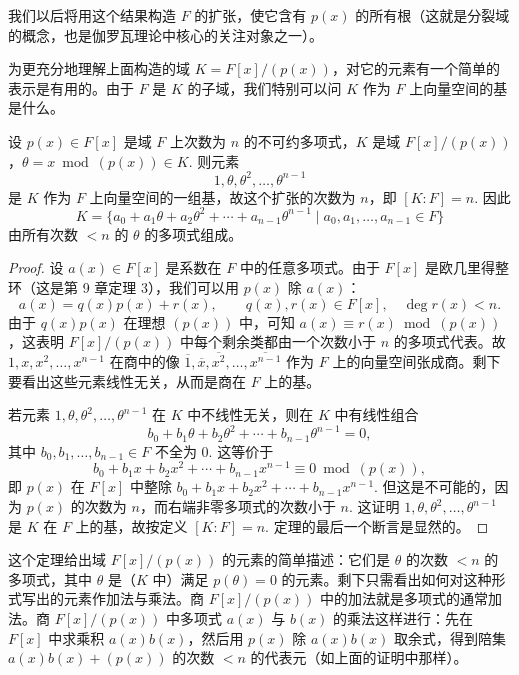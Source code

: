 我们以后将用这个结果构造 \(F\) 的扩张，使它含有 \(p(x)\) 的所有根（这就是分裂域的概念，也是伽罗瓦理论中核心的关注对象之一）。

为更充分地理解上面构造的域 \(K = F[x]/(p(x))\)，对它的元素有一个简单的表示是有用的。由于 \(F\) 是 \(K\) 的子域，我们特别可以问 \(K\) 作为 \(F\) 上向量空间的基是什么。

\begin{theorem}\label{thm:13.4}
设 \(p(x) \in F[x]\) 是域 \(F\) 上次数为 \(n\) 的不可约多项式，\(K\) 是域 \(F[x]/(p(x))\)，\(\theta = x \bmod (p(x)) \in K\). 则元素
\[
1, \theta, \theta^2, \ldots, \theta^{n-1}
\]
是 \(K\) 作为 \(F\) 上向量空间的一组基，故这个扩张的次数为 \(n\)，即 \([K:F] = n\). 因此
\[
K = \{a_0+a_1\theta+a_2\theta^2+\cdots+a_{n-1}\theta^{n-1} \mid a_0, a_1, \ldots, a_{n-1} \in F\}
\]
由所有次数 \(< n\) 的 \(\theta\) 的多项式组成。
\end{theorem}

\begin{proof}
设 \(a(x) \in F[x]\) 是系数在 \(F\) 中的任意多项式。由于 \(F[x]\) 是欧几里得整环（这是第 9 章定理 3），我们可以用 \(p(x)\) 除 \(a(x)\)：
\[
a(x) = q(x)p(x)+r(x), \qquad q(x), r(x) \in F[x], \quad \deg r(x) < n.
\]
由于 \(q(x)p(x)\) 在理想 \((p(x))\) 中，可知 \(a(x) \equiv r(x) \bmod (p(x))\)，这表明 \(F[x]/(p(x))\) 中每个剩余类都由一个次数小于 \(n\) 的多项式代表。故 \(1, x, x^2, \ldots, x^{n-1}\) 在商中的像 \(\overline{1}, \overline{x}, \overline{x^2}, \ldots, \overline{x^{n-1}}\) 作为 \(F\) 上的向量空间张成商。剩下要看出这些元素线性无关，从而是商在 \(F\) 上的基。

若元素 \(1, \theta, \theta^2, \ldots, \theta^{n-1}\) 在 \(K\) 中不线性无关，则在 \(K\) 中有线性组合
\[
b_0+b_1\theta+b_2\theta^2+\cdots+b_{n-1}\theta^{n-1} = 0,
\]
其中 \(b_0, b_1, \ldots, b_{n-1} \in F\) 不全为 0. 这等价于
\[
b_0+b_1x+b_2x^2+\cdots+b_{n-1}x^{n-1} \equiv 0 \bmod (p(x)),
\]
即 \(p(x)\) 在 \(F[x]\) 中整除 \(b_0+b_1x+b_2x^2+\cdots+b_{n-1}x^{n-1}\). 但这是不可能的，因为 \(p(x)\) 的次数为 \(n\)，而右端非零多项式的次数小于 \(n\). 这证明 \(1, \theta, \theta^2, \ldots, \theta^{n-1}\) 是 \(K\) 在 \(F\) 上的基，故按定义 \([K:F] = n\). 定理的最后一个断言是显然的。
\end{proof}

这个定理给出域 \(F[x]/(p(x))\) 的元素的简单描述：它们是 \(\theta\) 的次数 \(< n\) 的多项式，其中 \(\theta\) 是（\(K\) 中）满足 \(p(\theta) = 0\) 的元素。剩下只需看出如何对这种形式写出的元素作加法与乘法。商 \(F[x]/(p(x))\) 中的加法就是多项式的通常加法。商 \(F[x]/(p(x))\) 中多项式 \(a(x)\) 与 \(b(x)\) 的乘法这样进行：先在 \(F[x]\) 中求乘积 \(a(x)b(x)\)，然后用 \(p(x)\) 除 \(a(x)b(x)\) 取余式，得到陪集 \(a(x)b(x)+(p(x))\) 的次数 \(< n\) 的代表元（如上面的证明中那样）。


